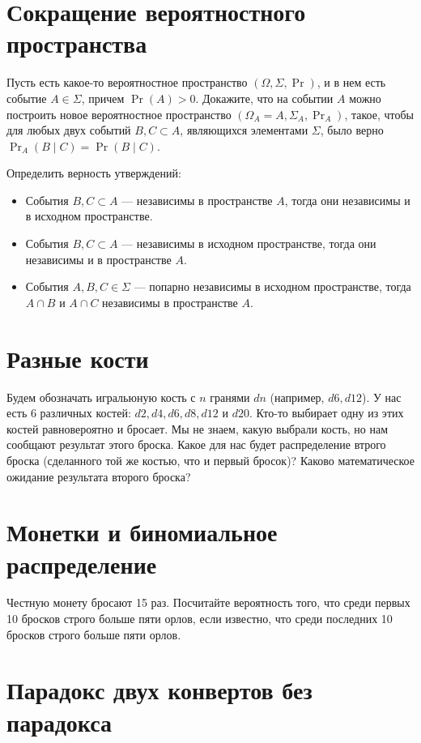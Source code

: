 \documentclass[12pt]{article}
\begin{document}
\section{Сокращение вероятностного пространства}

Пусть есть какое-то вероятностное пространство $(\Omega, \Sigma, \Pr)$, и в нем есть событие $A \in \Sigma$, причем $\Pr(A) > 0$. Докажите, что на событии $A$ можно построить новое вероятностное пространство $(\Omega_A = A, \Sigma_A, \Pr_A)$, такое, чтобы для любых двух событий $B, C \subset A$, являющихся элементами $\Sigma$, было верно $\Pr_A(B \mid C) = \Pr(B \mid C)$.

Определить верность утверждений:
\begin{itemize}
    \item События $B, C \subset A$ --- независимы в пространстве $A$, тогда они независимы и в исходном пространстве.
    \item События $B, C \subset A$ --- независимы в исходном пространстве, тогда они независимы и в пространстве $A$.
    \item События $A, B, C \in \Sigma$ --- попарно независимы в исходном пространстве, тогда $A \cap B$ и $A \cap C$ независимы в пространстве $A$.
\end{itemize}  

\section{Разные кости}

Будем обозначать игральюную кость с $n$ гранями $dn$ (например, $d6, d12$). У нас есть 6 различных костей: $d2, d4, d6, d8, d12$ и $d20$. Кто-то выбирает одну из этих костей равновероятно и бросает. Мы не знаем, какую выбрали кость, но нам сообщают результат этого броска. Какое для нас будет распределение втрого броска (сделанного той же костью, что и первый бросок)? Каково математическое ожидание результата второго броска?

\section{Монетки и биномиальное распределение}

Честную монету бросают 15 раз. Посчитайте вероятность того, что среди первых 10 бросков строго больше пяти орлов, если известно, что среди последних 10 бросков строго больше пяти орлов.

\section{Парадокс двух конвертов без парадокса}
\end{document}
